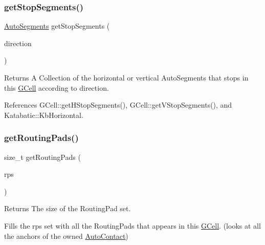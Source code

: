 \mbox{\label{classKatabatic_1_1GCell_a80ad0f9e79bccf6aed4fb69b4b795005}} 
\subsubsection{\texorpdfstring{get\+Stop\+Segments()}{getStopSegments()}}
{\footnotesize\ttfamily \mbox{\hyperlink{namespaceKatabatic_a2221b0ddbc24f331809fc86f98e38041}{Auto\+Segments}} get\+Stop\+Segments (\begin{DoxyParamCaption}\item[{unsigned int}]{direction }\end{DoxyParamCaption})\hspace{0.3cm}{\ttfamily [inline]}}

\begin{DoxyReturn}{Returns}
A Collection of the horizontal or vertical Auto\+Segments that stops in this \mbox{\hyperlink{classKatabatic_1_1GCell}{G\+Cell}} according to {\ttfamily direction}. 
\end{DoxyReturn}


References G\+Cell\+::get\+H\+Stop\+Segments(), G\+Cell\+::get\+V\+Stop\+Segments(), and Katabatic\+::\+Kb\+Horizontal.

\mbox{\label{classKatabatic_1_1GCell_a3bda8c3dbb2896a0e6e57f974d0c1cad}} 
\subsubsection{\texorpdfstring{get\+Routing\+Pads()}{getRoutingPads()}}
{\footnotesize\ttfamily size\+\_\+t get\+Routing\+Pads (\begin{DoxyParamCaption}\item[{set$<$ \textbf{ Routing\+Pad} $\ast$$>$ \&}]{rps }\end{DoxyParamCaption})}

\begin{DoxyReturn}{Returns}
The size of the Routing\+Pad set.
\end{DoxyReturn}
Fills the {\ttfamily rps} set with all the Routing\+Pads that appears in this \mbox{\hyperlink{classKatabatic_1_1GCell}{G\+Cell}}. (looks at all the anchors of the owned \mbox{\hyperlink{classKatabatic_1_1AutoContact}{Auto\+Contact}}) 

